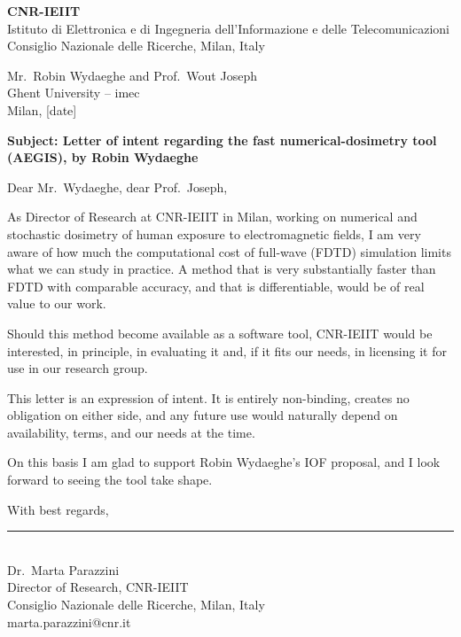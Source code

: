 \documentclass[11pt]{article}
\begin{document}
{\large\textbf{CNR-IEIIT}}\\
Istituto di Elettronica e di Ingegneria dell'Informazione e delle Telecomunicazioni\\
Consiglio Nazionale delle Ricerche, Milan, Italy\\[1.5em]

\begin{flushright}
Mr.\ Robin Wydaeghe and Prof.\ Wout Joseph\\
Ghent University -- imec\\[1em]
Milan, [date]
\end{flushright}

\bigskip
\textbf{Subject: Letter of intent regarding the fast numerical-dosimetry tool (AEGIS),
by Robin Wydaeghe}

\bigskip
Dear Mr.\ Wydaeghe, dear Prof.\ Joseph,

As Director of Research at CNR-IEIIT in Milan, working on numerical and stochastic dosimetry
of human exposure to electromagnetic fields, I am very aware of how much the computational
cost of full-wave (FDTD) simulation limits what we can study in practice. A method that is
very substantially faster than FDTD with comparable accuracy, and that is differentiable,
would be of real value to our work.

Should this method become available as a software tool, CNR-IEIIT would be interested, in
principle, in evaluating it and, if it fits our needs, in licensing it for use in our
research group.

This letter is an expression of intent. It is entirely non-binding, creates no obligation on
either side, and any future use would naturally depend on availability, terms, and our needs
at the time.

On this basis I am glad to support Robin Wydaeghe's IOF proposal, and I look forward to seeing
the tool take shape.

\bigskip
With best regards,

\vspace{2.2cm}

\rule{6cm}{0.4pt}\\
Dr.\ Marta Parazzini\\
Director of Research, CNR-IEIIT\\
Consiglio Nazionale delle Ricerche, Milan, Italy\\
marta.parazzini@cnr.it
\end{document}
